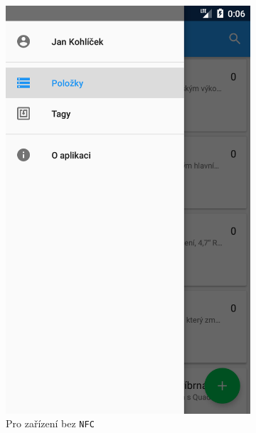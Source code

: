 \documentclass[12pt]{report}
\begin{document}
\begin{figure}[H]
\begin{subfigure}[b]{0.32\textwidth}
	\includegraphics[width=\textwidth]{../images/client_android/Screenshot_20180412-1523491587.png}	
	\caption{Pro zařízení bez \texttt{NFC}}
	\label{fig:Screenshot_20180412-1523491587}
  \end{subfigure}
  \begin{subfigure}[b]{0.3\textwidth}
    \centering

\end{subfigure}
\end{figure}
\end{document}
